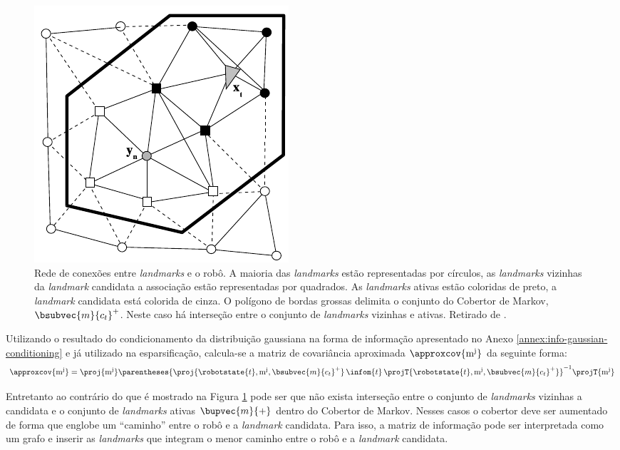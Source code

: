 \begin{figure}[h]
  \centering
  \includegraphics[]{figs/pb-markov-blanket}
  \caption{Rede de conexões entre \textit{landmarks} e o robô. A maioria das \textit{landmarks} estão representadas por círculos, as \textit{landmarks} vizinhas da \textit{landmark} candidata a associação estão representadas por quadrados. As \textit{landmarks} ativas estão coloridas de preto, a \textit{landmark} candidata está colorida de cinza. O polígono de bordas grossas delimita o conjunto do Cobertor de Markov, $\bsubvec{m}{c_t}^+$. Neste caso há interseção entre o conjunto de \textit{landmarks} vizinhas e ativas. Retirado de \cite[p.~410]{bongard2006probabilistic}.}
  \label{fig:markov-blanket}
\end{figure}

Utilizando o resultado do condicionamento da distribuição gaussiana na forma de 
informação apresentado no Anexo \ref{annex:info-gaussian-conditioning} e já 
utilizado na esparsificação, calcula-se a matriz de covariância aproximada $\approxcov{\mathrm{m^j}}$ da seguinte forma:
\begin{equation}
  \approxcov{\mathrm{m^j}} = \proj{\mathrm{m^j}} \parentheses{\proj{\robotstate{t}, \mathrm{m^j}, \bsubvec{m}{c_t}^+}\, \infom{t} \,\projT{\robotstate{t}, \mathrm{m^j}, \bsubvec{m}{c_t}^+}}^{-1} \projT{\mathrm{m^j}}
\end{equation}

Entretanto ao contrário do que é mostrado na Figura \ref{fig:markov-blanket} 
pode ser que não exista interseção entre o conjunto de \textit{landmarks} 
vizinhas a candidata e o conjunto de \textit{landmarks} ativas $\bupvec{m}{+}$ 
dentro do Cobertor de Markov. Nesses casos o cobertor deve ser aumentado de 
forma que englobe um ``caminho'' entre o robô e a \textit{landmark} candidata. 
Para isso, a matriz de informação pode ser interpretada como um grafo e inserir 
as \textit{landmarks} que integram o menor caminho entre o robô e a 
\textit{landmark} candidata.

